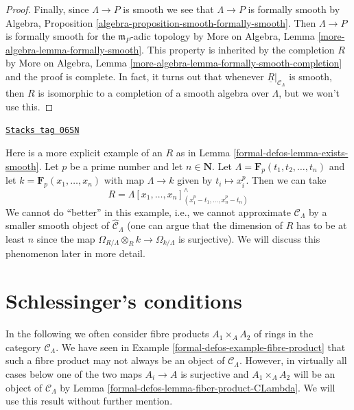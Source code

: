 \begin{proof}
\medskip\noindent
Finally, since $\Lambda \to P$ is smooth we see that
$\Lambda \to P$ is formally smooth by
Algebra, Proposition \ref{algebra-proposition-smooth-formally-smooth}.
Then $\Lambda \to P$ is formally smooth for the $\mathfrak m_P$-adic
topology by More on Algebra, Lemma \ref{more-algebra-lemma-formally-smooth}.
This property is inherited by the completion $R$ by
More on Algebra, Lemma \ref{more-algebra-lemma-formally-smooth-completion}
and the proof is complete.
In fact, it turns out that whenever $\underline{R}|_{\mathcal{C}_\Lambda}$
is smooth, then $R$ is isomorphic to a completion of a smooth
algebra over $\Lambda$, but we won't use this.
\end{proof}

\begin{example}
\label{formal-defos-example-smooth-explicit}
\href{https://stacks.math.columbia.edu/tag/06SN}{\texttt{Stacks tag 06SN}}

Here is a more explicit example of an $R$ as in
Lemma \ref{formal-defos-lemma-exists-smooth}.
Let $p$ be a prime number and let $n \in \mathbf{N}$.
Let $\Lambda = \mathbf{F}_p(t_1, t_2, \ldots, t_n)$ and let
$k = \mathbf{F}_p(x_1, \ldots, x_n)$ with map $\Lambda \to k$ given
by $t_i \mapsto x_i^p$. Then we can take
$$
R = \Lambda[x_1, \ldots, x_n]^\wedge_{(x_1^p - t_1, \ldots, x_n^p - t_n)}
$$
We cannot do ``better'' in this example, i.e., we cannot approximate
$\mathcal{C}_\Lambda$ by a smaller smooth object of
$\widehat{\mathcal{C}}_\Lambda$ (one can argue that the dimension of $R$
has to be at least $n$ since the map
$\Omega_{R/\Lambda} \otimes_R k \to \Omega_{k/\Lambda}$ is
surjective). We will discuss this phenomenon later in more detail.
\end{example}

\section{Schlessinger's conditions}
\label{formal-defos-section-schlessinger-conditions}
In the following we often consider fibre products $A_1 \times_A A_2$
of rings in the category $\mathcal{C}_\Lambda$. We have seen in
Example \ref{formal-defos-example-fibre-product}
that such a fibre product may not always be an object of
$\mathcal{C}_\Lambda$. However, in virtually all cases below one of the
two maps $A_i \to A$ is surjective and $A_1 \times_A A_2$ will be
an object of $\mathcal{C}_\Lambda$ by
Lemma \ref{formal-defos-lemma-fiber-product-CLambda}.
We will use this result without further mention.

